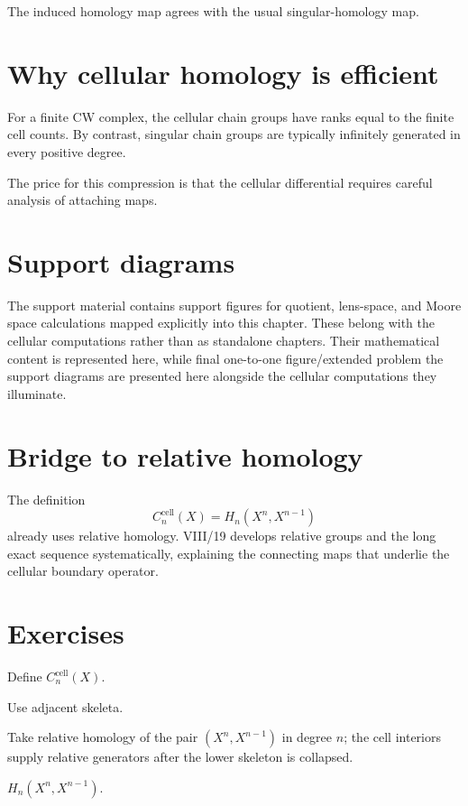 The induced homology map agrees with the usual singular-homology map.

\section{Why cellular homology is efficient}

For a finite CW complex, the cellular chain groups have ranks equal to the
finite cell counts.  By contrast, singular chain groups are typically
infinitely generated in every positive degree.

The price for this compression is that the cellular differential requires
careful analysis of attaching maps.

\section{Support diagrams}

The support material contains support figures for quotient, lens-space, and Moore
space calculations mapped explicitly into this chapter.  These belong with the
cellular computations rather than as standalone chapters.  Their mathematical
content is represented here, while final one-to-one figure/extended problem
the support diagrams are presented here alongside the cellular computations they illuminate.

\section{Bridge to relative homology}

The definition
\[
C_n^{\mathrm{cell}}(X)=H_n(X^n,X^{n-1})
\]
already uses relative homology.  VIII/19 develops relative groups and the long
exact sequence systematically, explaining the connecting maps that underlie
the cellular boundary operator.


\section{Exercises}

\begin{exercise}\label{exr:viii18-01}
Define \(C_n^{\mathrm{cell}}(X)\).
\end{exercise}
\begin{hint}
Use adjacent skeleta.

Take relative homology of the pair \((X^n,X^{n-1})\) in degree \(n\); the cell interiors supply relative generators after the lower skeleton is collapsed.
\end{hint}
\begin{solution}
\(H_n(X^n,X^{n-1})\).
\end{solution}


